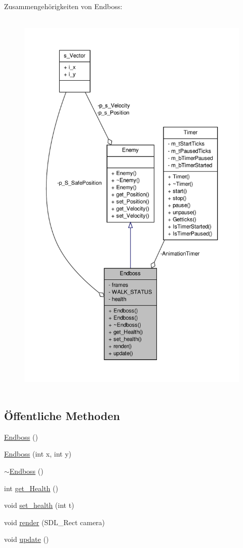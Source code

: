 Zusammengehörigkeiten von Endboss\-:
\nopagebreak
\begin{figure}[H]
\begin{center}
\leavevmode
\includegraphics[height=550pt]{class_endboss__coll__graph}
\end{center}
\end{figure}
\subsection*{Öffentliche Methoden}
\begin{DoxyCompactItemize}
\item 
\hyperlink{class_endboss_a07721dbe95bf63097d021b8b2a80791b}{Endboss} ()
\item 
\hyperlink{class_endboss_a6d553673da1e7b3d09ce54cd2503cbb7}{Endboss} (int x, int y)
\item 
\hyperlink{class_endboss_ab86f4e842ac4116c8df943539cc43787}{$\sim$\-Endboss} ()
\item 
int \hyperlink{class_endboss_a69ae2922f0f6647037926e917da4ee5e}{get\-\_\-\-Health} ()
\item 
void \hyperlink{class_endboss_a0bbf59647d911c6380246de92b5f5e21}{set\-\_\-health} (int t)
\item 
void \hyperlink{class_endboss_a17b150268f358172b140a984aaaa61c8}{render} (S\-D\-L\-\_\-\-Rect camera)
\item 
void \hyperlink{class_endboss_a7a56e4b087239ff73b7810c967e3858f}{update} ()
\end{DoxyCompactItemize}
